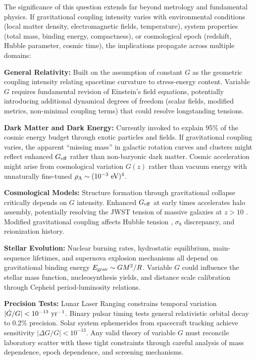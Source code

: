 \documentclass[11pt,a4paper]{article}
\begin{document}
The significance of this question extends far beyond metrology and
fundamental physics. If gravitational coupling intensity varies with
environmental conditions (local matter density, electromagnetic fields,
temperature), system properties (total mass, binding energy,
compactness), or cosmological epoch (redshift, Hubble parameter, cosmic
time), the implications propagate across multiple domains:

\textbf{General Relativity:} Built on the assumption of constant \(G\)
as the geometric coupling intensity relating spacetime curvature to
stress-energy content. Variable \(G\) requires fundamental revision of
Einstein's field equations, potentially introducing additional dynamical
degrees of freedom (scalar fields, modified metrics, non-minimal
coupling terms) that could resolve longstanding tensions.

\textbf{Dark Matter and Dark Energy:} Currently invoked to explain 95\%
of the cosmic energy budget through exotic particles and fields. If
gravitational coupling varies, the apparent ``missing mass'' in galactic
rotation curves and clusters might reflect enhanced \(G_{\rm eff}\)
rather than non-baryonic dark matter. Cosmic acceleration might arise
from cosmological variation \(G(z)\) rather than vacuum energy with
unnaturally fine-tuned \(\rho_\Lambda \sim (10^{-3}~{\rm eV})^4\).

\textbf{Cosmological Models:} Structure formation through gravitational
collapse critically depends on \(G\) intensity. Enhanced \(G_{\rm eff}\)
at early times accelerates halo assembly, potentially resolving the JWST
tension of massive galaxies at \(z > 10\) \cite{Naidu2022,ref30}. Modified gravitational
coupling affects Hubble tension \cite{Riess2022}, \(\sigma_8\) discrepancy, and
reionization history.

\textbf{Stellar Evolution:} Nuclear burning rates, hydrostatic
equilibrium, main-sequence lifetimes, and supernova explosion mechanisms
all depend on gravitational binding energy \(E_{\rm grav} \sim GM^2/R\).
Variable \(G\) could influence the stellar mass function,
nucleosynthesis yields, and distance scale calibration through Cepheid
period-luminosity relations.

\textbf{Precision Tests:} Lunar Laser Ranging constrains temporal
variation \(|\dot{G}/G| < 10^{-13}~{\rm yr^{-1}}\). Binary pulsar timing
tests general relativistic orbital decay to 0.2\% precision. Solar
system ephemerides from spacecraft tracking achieve sensitivity
\(|\Delta G/G| < 10^{-13}\). Any valid theory of variable \(G\) must
reconcile laboratory scatter with these tight constraints through
careful analysis of mass dependence, epoch dependence, and screening
mechanisms.
\end{document}
